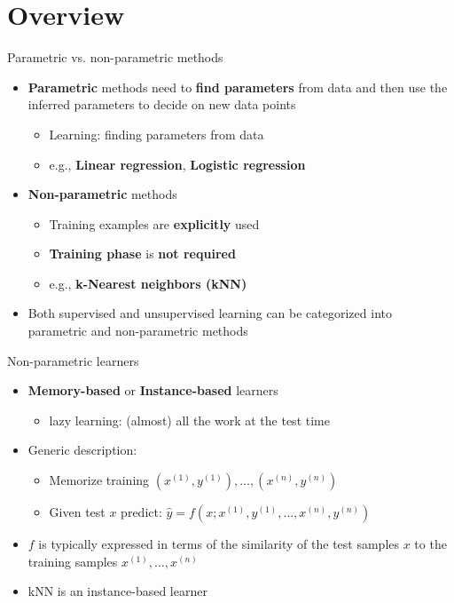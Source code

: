 \documentclass[serif, aspectratio=169]{beamer}
\begin{document}
\section{Overview}
\begin{frame}{Parametric vs. non-parametric methods}
    \begin{itemize}
        \item \textbf{Parametric} methods need to \textbf{find parameters} from data and then use the inferred parameters to decide on new data points
        \begin{itemize}
            \item Learning: finding parameters from data
            \item e.g., \textbf{Linear regression}, \textbf{Logistic regression}
        \end{itemize}
        \item \textbf{Non-parametric} methods
        \begin{itemize}
            \item Training examples are \textbf{explicitly} used
            \item \textbf{Training phase} is \textbf{not required}
            \item e.g., \textbf{k-Nearest neighbors (kNN)}
        \end{itemize}
        \item Both supervised and unsupervised learning can be categorized into parametric and non-parametric methods
    \end{itemize}
\end{frame}
\begin{frame}{Non-parametric learners}
    \begin{itemize}
        \item \textbf{Memory-based} or \textbf{Instance-based} learners
        \begin{itemize}
            \item lazy learning: (almost) all the work at the test time
        \end{itemize}
        
        \item Generic description:
        \begin{itemize}
            \item Memorize training $(x^{(1)}, y^{(1)}), \dots, (x^{(n)}, y^{(n)})$
            \item Given test $x$ predict: $\hat{y} = f(x;x^{(1)}, y^{(1)}, \dots, x^{(n)}, y^{(n)})$
        \end{itemize}
        \item $f$ is typically expressed in terms of the similarity of the test samples $x$ to the training samples $x^{(1)}, \dots, x^{(n)}$
        \item kNN is an instance-based learner
    \end{itemize}
\end{frame}
\end{document}
